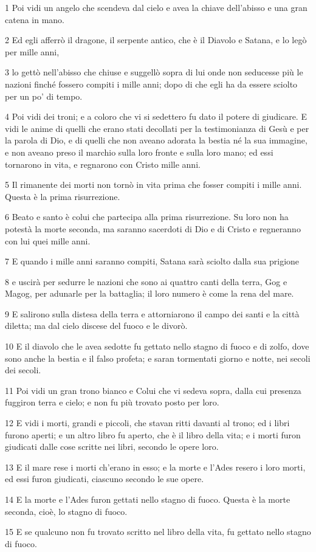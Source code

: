 \par 1 Poi vidi un angelo che scendeva dal cielo e avea la chiave dell'abisso e una gran catena in mano.
\par 2 Ed egli afferrò il dragone, il serpente antico, che è il Diavolo e Satana, e lo legò per mille anni,
\par 3 lo gettò nell'abisso che chiuse e suggellò sopra di lui onde non seducesse più le nazioni finché fossero compiti i mille anni; dopo di che egli ha da essere sciolto per un po' di tempo.
\par 4 Poi vidi dei troni; e a coloro che vi si sedettero fu dato il potere di giudicare. E vidi le anime di quelli che erano stati decollati per la testimonianza di Gesù e per la parola di Dio, e di quelli che non aveano adorata la bestia né la sua immagine, e non aveano preso il marchio sulla loro fronte e sulla loro mano; ed essi tornarono in vita, e regnarono con Cristo mille anni.
\par 5 Il rimanente dei morti non tornò in vita prima che fosser compiti i mille anni. Questa è la prima risurrezione.
\par 6 Beato e santo è colui che partecipa alla prima risurrezione. Su loro non ha potestà la morte seconda, ma saranno sacerdoti di Dio e di Cristo e regneranno con lui quei mille anni.
\par 7 E quando i mille anni saranno compiti, Satana sarà sciolto dalla sua prigione
\par 8 e uscirà per sedurre le nazioni che sono ai quattro canti della terra, Gog e Magog, per adunarle per la battaglia; il loro numero è come la rena del mare.
\par 9 E salirono sulla distesa della terra e attorniarono il campo dei santi e la città diletta; ma dal cielo discese del fuoco e le divorò.
\par 10 E il diavolo che le avea sedotte fu gettato nello stagno di fuoco e di zolfo, dove sono anche la bestia e il falso profeta; e saran tormentati giorno e notte, nei secoli dei secoli.
\par 11 Poi vidi un gran trono bianco e Colui che vi sedeva sopra, dalla cui presenza fuggiron terra e cielo; e non fu più trovato posto per loro.
\par 12 E vidi i morti, grandi e piccoli, che stavan ritti davanti al trono; ed i libri furono aperti; e un altro libro fu aperto, che è il libro della vita; e i morti furon giudicati dalle cose scritte nei libri, secondo le opere loro.
\par 13 E il mare rese i morti ch'erano in esso; e la morte e l'Ades resero i loro morti, ed essi furon giudicati, ciascuno secondo le sue opere.
\par 14 E la morte e l'Ades furon gettati nello stagno di fuoco. Questa è la morte seconda, cioè, lo stagno di fuoco.
\par 15 E se qualcuno non fu trovato scritto nel libro della vita, fu gettato nello stagno di fuoco.


